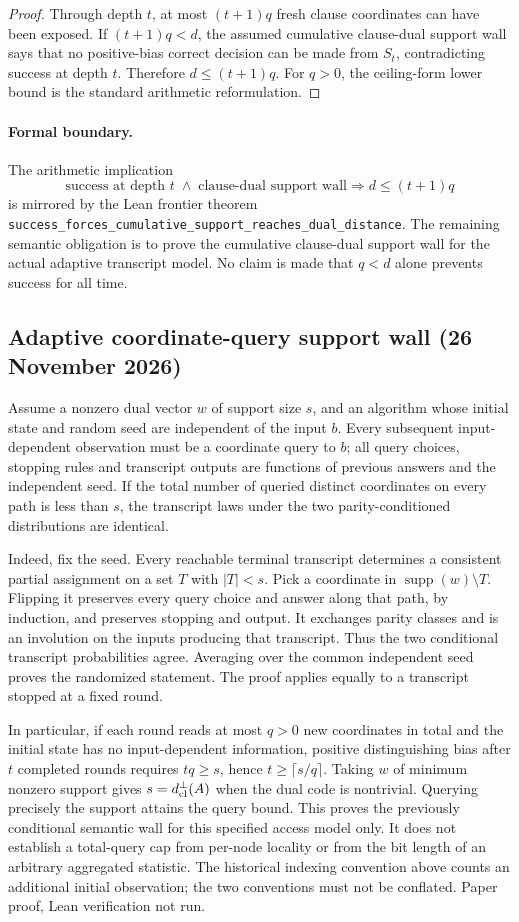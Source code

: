 \begin{proof}
Through depth $t$, at most $(t+1)q$ fresh clause coordinates can have been exposed.
If $(t+1)q<d$, the assumed cumulative clause-dual support wall says that no positive-bias correct decision can be made from $S_t$, contradicting success at depth $t$.
Therefore $d\le (t+1)q$.
For $q>0$, the ceiling-form lower bound is the standard arithmetic reformulation.
\end{proof}

\paragraph{Formal boundary.}
The arithmetic implication
\[
\text{success at depth }t\;\wedge\;\text{clause-dual support wall}
\Longrightarrow d\le (t+1)q
\]
is mirrored by the Lean frontier theorem
\texttt{success\_forces\_cumulative\_support\_reaches\_dual\_distance}.
The remaining semantic obligation is to prove the cumulative clause-dual support wall for the actual adaptive transcript model.  No claim is made that $q<d$ alone prevents success for all time.


\subsection{Adaptive coordinate-query support wall (26 November 2026)}
Assume a nonzero dual vector $w$ of support size $s$, and an algorithm whose initial state and random seed are independent of the input $b$. Every subsequent input-dependent observation must be a coordinate query to $b$; all query choices, stopping rules and transcript outputs are functions of previous answers and the independent seed. If the total number of queried distinct coordinates on every path is less than $s$, the transcript laws under the two parity-conditioned distributions are identical.

Indeed, fix the seed. Every reachable terminal transcript determines a consistent partial assignment on a set $T$ with $|T|<s$. Pick a coordinate in $\operatorname{supp}(w)\setminus T$. Flipping it preserves every query choice and answer along that path, by induction, and preserves stopping and output. It exchanges parity classes and is an involution on the inputs producing that transcript. Thus the two conditional transcript probabilities agree. Averaging over the common independent seed proves the randomized statement. The proof applies equally to a transcript stopped at a fixed round.

In particular, if each round reads at most $q>0$ new coordinates in total and the initial state has no input-dependent information, positive distinguishing bias after $t$ completed rounds requires $tq\ge s$, hence $t\ge\lceil s/q\rceil$. Taking $w$ of minimum nonzero support gives $s=d^\perp_{\rm cl}(A)$ when the dual code is nontrivial. Querying precisely the support attains the query bound. This proves the previously conditional semantic wall for this specified access model only. It does not establish a total-query cap from per-node locality or from the bit length of an arbitrary aggregated statistic. The historical indexing convention above counts an additional initial observation; the two conventions must not be conflated. Paper proof, Lean verification not run.
